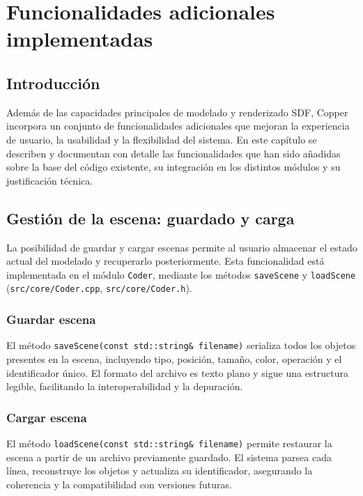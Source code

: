 \chapter{Funcionalidades adicionales implementadas}

\section{Introducción}

Además de las capacidades principales de modelado y renderizado SDF, Copper
incorpora un conjunto de funcionalidades adicionales que mejoran la experiencia
de usuario, la usabilidad y la flexibilidad del sistema. En este capítulo se
describen y documentan con detalle las funcionalidades que han sido añadidas
sobre la base del código existente, su integración en los distintos módulos y
su justificación técnica.

\section{Gestión de la escena: guardado y carga}

La posibilidad de guardar y cargar escenas permite al usuario almacenar el
estado actual del modelado y recuperarlo posteriormente. Esta funcionalidad
está implementada en el módulo \texttt{Coder}, mediante los métodos
\texttt{saveScene} y \texttt{loadScene} (\texttt{src/core/Coder.cpp},
\texttt{src/core/Coder.h}).
\subsection{Guardar escena}

El método \texttt{saveScene(const std::string\& filename)} serializa todos los
objetos presentes en la escena, incluyendo tipo, posición, tamaño, color,
operación y el identificador único. El formato del archivo es texto plano y
sigue una estructura legible, facilitando la interoperabilidad y la depuración.

\subsection{Cargar escena}

El método \texttt{loadScene(const std::string\& filename)} permite restaurar la
escena a partir de un archivo previamente guardado. El sistema parsea cada
línea, reconstruye los objetos y actualiza su identificador, asegurando la
coherencia y la compatibilidad con versiones futuras.

